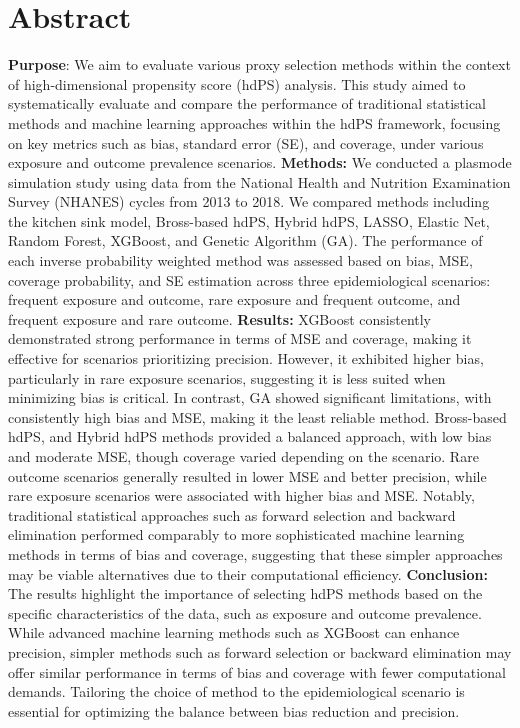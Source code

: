 \documentclass[10pt,letterpaper]{article}
\begin{document}
\section*{Abstract}
\textbf{Purpose}: We aim to evaluate various proxy selection methods
within the context of high-dimensional propensity score (hdPS) analysis.
This study aimed to systematically evaluate and compare the performance
of traditional statistical methods and machine learning approaches
within the hdPS framework, focusing on key metrics such as bias,
standard error (SE), and coverage, under various exposure and outcome
prevalence scenarios. \textbf{Methods:} We conducted a plasmode
simulation study using data from the National Health and Nutrition
Examination Survey (NHANES) cycles from 2013 to 2018. We compared
methods including the kitchen sink model, Bross-based hdPS, Hybrid hdPS,
LASSO, Elastic Net, Random Forest, XGBoost, and Genetic Algorithm (GA).
The performance of each inverse probability weighted method was assessed
based on bias, MSE, coverage probability, and SE estimation across three
epidemiological scenarios: frequent exposure and outcome, rare exposure
and frequent outcome, and frequent exposure and rare outcome.
\textbf{Results:} XGBoost consistently demonstrated strong performance
in terms of MSE and coverage, making it effective for scenarios
prioritizing precision. However, it exhibited higher bias, particularly
in rare exposure scenarios, suggesting it is less suited when minimizing
bias is critical. In contrast, GA showed significant limitations, with
consistently high bias and MSE, making it the least reliable method.
Bross-based hdPS, and Hybrid hdPS methods provided a balanced approach,
with low bias and moderate MSE, though coverage varied depending on the
scenario. Rare outcome scenarios generally resulted in lower MSE and
better precision, while rare exposure scenarios were associated with
higher bias and MSE. Notably, traditional statistical approaches such as
forward selection and backward elimination performed comparably to more
sophisticated machine learning methods in terms of bias and coverage,
suggesting that these simpler approaches may be viable alternatives due
to their computational efficiency. \textbf{Conclusion:} The results
highlight the importance of selecting hdPS methods based on the specific
characteristics of the data, such as exposure and outcome prevalence.
While advanced machine learning methods such as XGBoost can enhance
precision, simpler methods such as forward selection or backward
elimination may offer similar performance in terms of bias and coverage
with fewer computational demands. Tailoring the choice of method to the
epidemiological scenario is essential for optimizing the balance between
bias reduction and precision.
\end{document}
